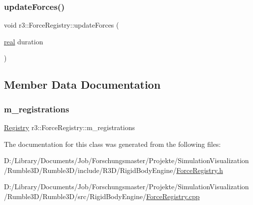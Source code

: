 \mbox{\label{classr3_1_1_force_registry_a34d6ad7472e2f47dfd3416a703eca78e}} 
\subsubsection{\texorpdfstring{update\+Forces()}{updateForces()}}
{\footnotesize\ttfamily void r3\+::\+Force\+Registry\+::update\+Forces (\begin{DoxyParamCaption}\item[{\mbox{\hyperlink{namespacer3_ab2016b3e3f743fb735afce242f0dc1eb}{real}}}]{duration }\end{DoxyParamCaption})}



\subsection{Member Data Documentation}
\mbox{\label{classr3_1_1_force_registry_a36847da26301dc4b18e6b6b25fb2fa51}} 
\subsubsection{\texorpdfstring{m\+\_\+registrations}{m\_registrations}}
{\footnotesize\ttfamily \mbox{\hyperlink{classr3_1_1_force_registry_a91449a71b1a33d773ef787ae56ae9b2d}{Registry}} r3\+::\+Force\+Registry\+::m\+\_\+registrations\hspace{0.3cm}{\ttfamily [protected]}}



The documentation for this class was generated from the following files\+:\begin{DoxyCompactItemize}
\item 
D\+:/\+Library/\+Documents/\+Job/\+Forschungsmaster/\+Projekte/\+Simulation\+Visualization/\+Rumble3\+D/\+Rumble3\+D/include/\+R3\+D/\+Rigid\+Body\+Engine/\mbox{\hyperlink{_force_registry_8h}{Force\+Registry.\+h}}\item 
D\+:/\+Library/\+Documents/\+Job/\+Forschungsmaster/\+Projekte/\+Simulation\+Visualization/\+Rumble3\+D/\+Rumble3\+D/src/\+Rigid\+Body\+Engine/\mbox{\hyperlink{_force_registry_8cpp}{Force\+Registry.\+cpp}}\end{DoxyCompactItemize}

